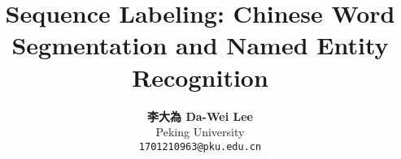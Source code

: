 \documentclass[12pt]{article}
\title{\textbf{Sequence Labeling: Chinese Word Segmentation and Named Entity Recognition}}
\author{\textbf{李大為 Da-Wei Lee} \\
Peking University \\
{\tt 1701210963@pku.edu.cn}}
\date{\vspace{-5ex}}
\begin{document}
\maketitle

\begin{multicols}{2}





\end{multicols}







\end{document}
